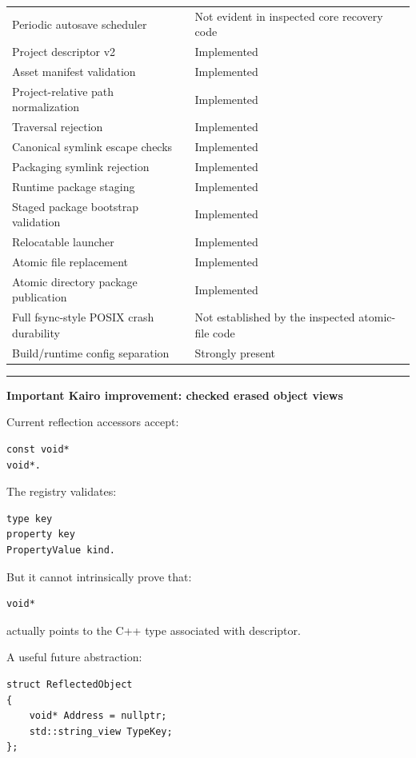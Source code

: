 {\begin{longtable}[]{@{}
  >{\raggedright\arraybackslash}p{}
  >{\raggedright\arraybackslash}p{}@{}}
Periodic autosave scheduler & Not evident in inspected core recovery code \\
Project descriptor v2 & Implemented \\
Asset manifest validation & Implemented \\
Project-relative path normalization & Implemented \\
Traversal rejection & Implemented \\
Canonical symlink escape checks & Implemented \\
Packaging symlink rejection & Implemented \\
Runtime package staging & Implemented \\
Staged package bootstrap validation & Implemented \\
Relocatable launcher & Implemented \\
Atomic file replacement & Implemented \\
Atomic directory package publication & Implemented \\
Full fsync-style POSIX crash durability & Not established by the inspected atomic-file code \\
Build/runtime config separation & Strongly present \\
\end{longtable}
}

\begin{center}\rule{0.5\linewidth}{0.5pt}\end{center}

\textbf{Important Kairo improvement: checked erased object views}

Current reflection accessors accept:

\begin{verbatim}
const void*
void*.
\end{verbatim}

The registry validates:

\begin{verbatim}
type key
property key
PropertyValue kind.
\end{verbatim}

But it cannot intrinsically prove that:

\begin{verbatim}
void*
\end{verbatim}

actually points to the C++ type associated with descriptor.

A useful future abstraction:

\begin{verbatim}
struct ReflectedObject
{
    void* Address = nullptr;
    std::string_view TypeKey;
};
\end{verbatim}

